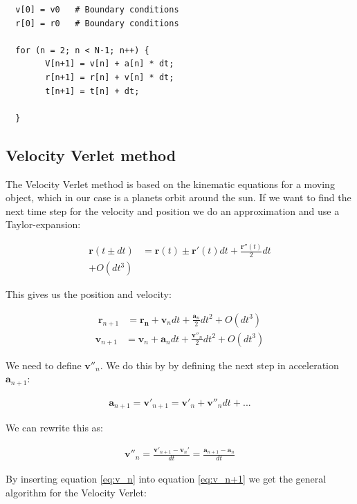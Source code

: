 \documentclass{article}
\begin{document}
\begin{verbatim}
  v[0] = v0   # Boundary conditions
  r[0] = r0   # Boundary conditions

  for (n = 2; n < N-1; n++) {
        V[n+1] = v[n] + a[n] * dt;
        r[n+1] = r[n] + v[n] * dt;
        t[n+1] = t[n] + dt;
        
  }

\end{verbatim}

\subsection{Velocity Verlet method}
The Velocity Verlet method is based on the kinematic equations for a moving object, which in our case is a planets orbit around the sun. If we want to find the next time step for the velocity and position we do an approximation and use a Taylor-expansion:    

\begin{align*}
\mathbf{r}(t\pm dt)&=\mathbf{r}(t)\pm \mathbf{r}'(t)dt + \frac{\mathbf{r}''(t)}{2}dt\\ + O(dt^3)
\end{align*}

This gives us the position and velocity:

\begin{align}
    \mathbf{r}_{n+1}&=\mathbf{r_n}+\mathbf{v}_n dt + \frac{\mathbf{a}_n}{2}dt^2+O(dt^3)
    \label{eq:r_n+1}
    \end{align}
    \begin{align}
    \mathbf{v}_{n+1}&=\mathbf{v}_n+\mathbf{a}_ndt+\frac{\mathbf{v}''_n}{2}dt^2 + O(dt^3)
     \label{eq:v_n+1}
\end{align}

We need to define $\mathbf{v}''_n$. We do this by by defining the next step in acceleration $\mathbf{a}_{n+1}$:

\begin{align*}
    \mathbf{a}_{n+1}=\mathbf{v}'_{n+1}=\mathbf{v}'_n+\mathbf{v}''_ndt + ...
\end{align*}

We can rewrite this as:

\begin{align}
        \mathbf{v}''_n=\frac{\mathbf{v}'_{n+1}-\mathbf{v}_n'}{dt}
    =\frac{\mathbf{a}_{n+1}-\mathbf{a}_n}{dt}
    \label{eq:v_n}
\end{align}

By inserting equation \ref{eq:v_n} into equation \ref{eq:v_n+1} we get the general algorithm for the Velocity Verlet:
\end{document}
